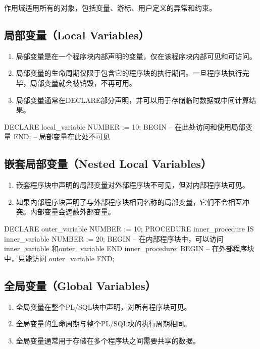 \documentclass[11pt, a4paper, oneside, UTF8]{ctexbook}
\begin{document}
作用域适用所有的对象，包括变量、游标、用户定义的异常和约束。

\subsection{局部变量（Local Variables）}
\begin{enumerate}
  \item 局部变量是在一个程序块内部声明的变量，仅在该程序块内部可见和可访问。
  \item 局部变量的生命周期仅限于包含它的程序块的执行期间。一旦程序块执行完毕，局部变量就会被销毁，不再可用。
  \item 局部变量通常在DECLARE部分声明，并可以用于存储临时数据或中间计算结果。
\end{enumerate}

\begin{plsql}[caption=局部变量作用域示例]
DECLARE
  local_variable NUMBER := 10;
BEGIN
  -- 在此处访问和使用局部变量
END;
-- 局部变量在此处不可见
\end{plsql}

\subsection{嵌套局部变量（Nested Local Variables）}
\begin{enumerate}
  \item 嵌套程序块中声明的局部变量对外部程序块不可见，但对内部程序块可见。
  \item 如果内部程序块声明了与外部程序块相同名称的局部变量，它们不会相互冲突。内部变量会遮蔽外部变量。
\end{enumerate}

\begin{plsql}[caption=嵌套局部变量作用域示例]
DECLARE
  outer_variable NUMBER := 10;
  PROCEDURE inner_procedure IS
    inner_variable NUMBER := 20;
  BEGIN
    -- 在内部程序块中，可以访问 inner_variable 和outer_variable
  END inner_procedure;
BEGIN
  -- 在外部程序块中，只能访问 outer_variable
END;
\end{plsql}

\subsection{全局变量（Global Variables）}
\begin{enumerate}
  \item 全局变量在整个PL/SQL块中声明，对所有程序块可见。
  \item 全局变量的生命周期与整个PL/SQL块的执行周期相同。
  \item 全局变量通常用于存储在多个程序块之间需要共享的数据。
\end{enumerate}
\end{document}
